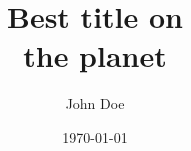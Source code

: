 \titlehead{\textbf{titlehead:} titlehead \hugeskip}
\subject{\hugeskip}
\title{Best title on \\ the planet \bigskip}
\author{John Doe \bigskip}
\date{\today}
\publishers{\hugeskip\hugeskip\hugeskip\hugeskip University of Whatever \\ London}